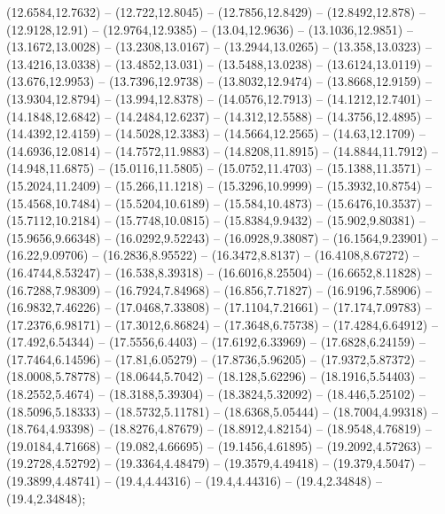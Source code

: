 {  (12.6584,12.7632) -- (12.722,12.8045) -- (12.7856,12.8429) -- (12.8492,12.878) -- (12.9128,12.91) -- (12.9764,12.9385) -- (13.04,12.9636) -- (13.1036,12.9851) -- (13.1672,13.0028) -- (13.2308,13.0167) -- (13.2944,13.0265) -- (13.358,13.0323) --
  (13.4216,13.0338) -- (13.4852,13.031) -- (13.5488,13.0238) -- (13.6124,13.0119) -- (13.676,12.9953) -- (13.7396,12.9738) -- (13.8032,12.9474) -- (13.8668,12.9159) -- (13.9304,12.8794) -- (13.994,12.8378) -- (14.0576,12.7913) -- (14.1212,12.7401) --
  (14.1848,12.6842) -- (14.2484,12.6237) -- (14.312,12.5588) -- (14.3756,12.4895) -- (14.4392,12.4159) -- (14.5028,12.3383) -- (14.5664,12.2565) -- (14.63,12.1709) -- (14.6936,12.0814) -- (14.7572,11.9883) -- (14.8208,11.8915) -- (14.8844,11.7912) --
  (14.948,11.6875) -- (15.0116,11.5805) -- (15.0752,11.4703) -- (15.1388,11.3571) -- (15.2024,11.2409) -- (15.266,11.1218) -- (15.3296,10.9999) -- (15.3932,10.8754) -- (15.4568,10.7484) -- (15.5204,10.6189) -- (15.584,10.4873) -- (15.6476,10.3537) --
  (15.7112,10.2184) -- (15.7748,10.0815) -- (15.8384,9.9432) -- (15.902,9.80381) -- (15.9656,9.66348) -- (16.0292,9.52243) -- (16.0928,9.38087) -- (16.1564,9.23901) -- (16.22,9.09706) -- (16.2836,8.95522) -- (16.3472,8.8137) -- (16.4108,8.67272) --
  (16.4744,8.53247) -- (16.538,8.39318) -- (16.6016,8.25504) -- (16.6652,8.11828) -- (16.7288,7.98309) -- (16.7924,7.84968) -- (16.856,7.71827) -- (16.9196,7.58906) -- (16.9832,7.46226) -- (17.0468,7.33808) -- (17.1104,7.21661) -- (17.174,7.09783) --
  (17.2376,6.98171) -- (17.3012,6.86824) -- (17.3648,6.75738) -- (17.4284,6.64912) -- (17.492,6.54344) -- (17.5556,6.4403) -- (17.6192,6.33969) -- (17.6828,6.24159) -- (17.7464,6.14596) -- (17.81,6.05279) -- (17.8736,5.96205) -- (17.9372,5.87372) --
  (18.0008,5.78778) -- (18.0644,5.7042) -- (18.128,5.62296) -- (18.1916,5.54403) -- (18.2552,5.4674) -- (18.3188,5.39304) -- (18.3824,5.32092) -- (18.446,5.25102) -- (18.5096,5.18333) -- (18.5732,5.11781) -- (18.6368,5.05444) -- (18.7004,4.99318) --
  (18.764,4.93398) -- (18.8276,4.87679) -- (18.8912,4.82154) -- (18.9548,4.76819) -- (19.0184,4.71668) -- (19.082,4.66695) -- (19.1456,4.61895) -- (19.2092,4.57263) -- (19.2728,4.52792) -- (19.3364,4.48479) -- (19.3579,4.49418) -- (19.379,4.5047) --
  (19.3899,4.48741) -- (19.4,4.44316) -- (19.4,4.44316) -- (19.4,2.34848) -- (19.4,2.34848);
}
